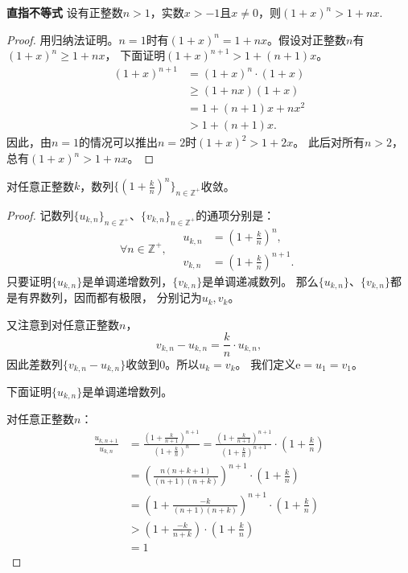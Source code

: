 \documentclass[12pt,UTF8,fontset=none]{ctexbook}
\begin{document}
\begin{appendix}
\begin{tm}{\textbf{直指不等式}}\label{tm:b-1-20}
    设有正整数$n > 1$，实数$x > -1$且$x \neq 0$，则$(1 + x)^n > 1 + nx.$
\end{tm}

\begin{proof}
    用归纳法证明。$n = 1$时有$(1 + x)^n = 1 + nx$。假设对正整数$n$有$(1 + x)^n \geqslant 1 + nx$，
    下面证明$(1 + x)^{n+1} > 1 + (n+1)x$。
    \begin{align*}
        (1 + x)^{n+1} &= (1 + x)^{n} \cdot (1 + x)  \\
        &\geqslant (1 + nx)(1 + x)  \\
        &= 1 + (n + 1)x + nx^2  \\
        &> 1 + (n + 1)x.
   \end{align*}
   因此，由$n=1$的情况可以推出$n=2$时$(1 + x)^{2} > 1 + 2x$。
   此后对所有$n>2$，总有$(1 + x)^{n} > 1 + nx$。
\end{proof}

\begin{tm}\label{tm:b-1-30}
    对任意正整数$k$，数列$\{\left(1 + \frac{k}{n}\right)^n\}_{n\in\mathbb{Z}^+}$收敛。
\end{tm}

\begin{proof}
    记数列$\{u_{k,n}\}_{n\in\mathbb{Z}^+}$、$\{v_{k,n}\}_{n\in\mathbb{Z}^+}$的通项分别是：
    $$
    \forall n \in\mathbb{Z}^+, \quad
    \begin{array}{cl}
        u_{k,n} &=  \left(1 + \frac{k}{n}\right)^n, \\
        v_{k,n} &= \left(1 + \frac{k}{n}\right)^{n+1}.
    \end{array}
    $$
    只要证明$\{u_{k,n}\}$是单调递增数列，$\{v_{k,n}\}$是单调递减数列。
    那么$\{u_{k,n}\}$、$\{v_{k,n}\}$都是有界数列，因而都有极限，
    分别记为$u_{k}, v_k$。

    又注意到对任意正整数$n$，
    $$v_{k,n} - u_{k,n} = \frac{k}{n} \cdot u_{k,n}, $$
    因此差数列$\{v_{k,n} - u_{k,n}\}$收敛到$0$。所以$u_k = v_k$。
    我们定义$\mathrm{e} = u_1 = v_1$。

    下面证明$\{u_{k,n}\}$是单调递增数列。

    对任意正整数$n$：
    \begin{align*}
        \frac{u_{k,n+1}}{u_{k,n}} &= \frac{\left(1 + \frac{k}{n+1}\right)^{n+1}}{\left(1 + \frac{k}{n}\right)^n} = \frac{\left(1 + \frac{k}{n+1}\right)^{n+1}}{\left(1 + \frac{k}{n}\right)^{n+1}} \cdot \left(1 + \frac{k}{n}\right)  \\
        &= \left(\frac{n(n+k+1)}{(n+1)(n+k)}\right)^{n+1} \cdot \left(1 + \frac{k}{n}\right)  \\
        &= \left(1 + \frac{-k}{(n+1)(n+k)}\right)^{n+1} \cdot \left(1 + \frac{k}{n}\right)  \\
        &> \left(1 + \frac{-k}{n+k}\right)\cdot \left(1 + \frac{k}{n}\right) \tag{直指不等式} \\
        &= 1  
    \end{align*}
    

\end{proof}
\end{appendix}
\end{document}
